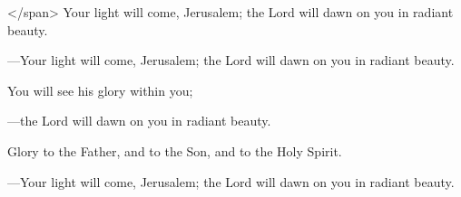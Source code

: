 \responsory

\begin{hangpar}

</span>
Your light will come, Jerusalem;
the Lord will dawn on you in radiant beauty.

{\color{red}---\thinspace }Your light will come, Jerusalem;
the Lord will dawn on you in radiant beauty.

\medskip You will see his glory within you;

{\color{red}---\thinspace }the Lord will dawn on you in radiant beauty.

\medskip Glory to the Father, and to the Son, and to the Holy Spirit.

{\color{red}---\thinspace }Your light will come, Jerusalem;
the Lord will dawn on you in radiant beauty.
\end{hangpar}